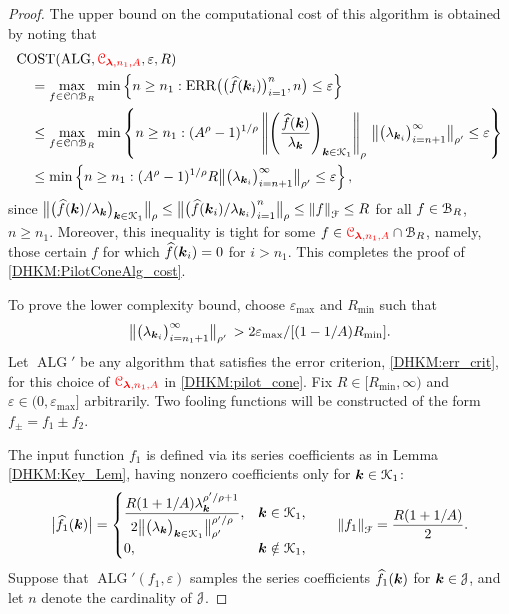 \documentclass[USenglish]{article}
\theoremstyle{dgthm}
\theoremstyle{dgthm}
\theoremstyle{dgthm}
\theoremstyle{dgthm}
\theoremstyle{dgdef}
\theoremstyle{definition}
\DeclareMathOperator{\ALG}{ALG}
\DeclareMathOperator{\ERR}{ERR}
\newcommand{\dataN}{\bigl(\hf(\bsk_i)\bigr)_{i=1}^n}
\newcommand{\ERRN}{\ERR\bigl(\dataN,n\bigr)}
\DeclareMathOperator{\COST}{COST}
\newcommand{\hf}{\widehat{f}}
\newcommand{\bigabs}[1]{\ensuremath{\bigl \lvert #1 \bigr \rvert}}
\newcommand{\norm}[2][{}]{\ensuremath{\left \lVert #2 \right \rVert}_{#1}}
\newcommand{\bignorm}[2][{}]{\ensuremath{\bigl \lVert #2 \bigr \rVert}_{#1}}
\newcommand{\DHKMchange}[1]{{\color{red}{#1}}}
\begin{document}
\begin{proof} 
The upper bound on the computational cost of this algorithm is obtained by noting that 
\begin{align*}
    \MoveEqLeft[1]{\COST(\ALG,\DHKMchange{\calC_{\boldsymbol{\lambda},n_1,A}},\varepsilon,R)} \\
    & = \max_{f \in \calC \cap \calB_{R}} \min \left \{n \ge n_1 : \ERRN \le \varepsilon \right \} \\
     & \le \max_{f \in \calC \cap \calB_{R}} \min \left \{n \ge n_1 : 
     (A^\rho -1)^{1/\rho} \norm[\rho]{\left( \frac{\hf(\bsk)}{\lambda_{\bsk}} \right)_{\bsk \in \calK_1 }} \, 
     \bignorm[\rho']{\bigl(  \lambda_{\bsk_i}  \bigr)_{i = n+1}^{\infty}}
    \le \varepsilon \right \} \\   
     & \le \min \left \{n \ge n_1 : 
     (A^\rho -1)^{1/\rho} R \bignorm[\rho']{\bigl(  \lambda_{\bsk_i}  \bigr)_{i = n+1}^{\infty}} 
    \le \varepsilon \right \},  
\end{align*}
since $\bignorm[\rho]{\bigl( \hf(\bsk)/\lambda_{\bsk} \bigr)_{\bsk \in \calK_1}} \le \bignorm[\rho]{\bigl( \hf(\bsk_i)/\lambda_{\bsk_i} \bigr)_{i=1}^{n}} \le  \norm[\calF]{f} \le R$ for all $f \in {\mathcal{B}}_R$, $n \ge n_1$.  Moreover, this inequality is tight for some $f \in \DHKMchange{\calC_{\boldsymbol{\lambda},n_1,A}} \cap \calB_{R}$, namely, those certain $f$ for which $\hf(\bsk_i) = 0$ for $i > n_1$.  This completes the proof of \eqref{DHKM:PilotConeAlg_cost}.

To prove the lower complexity bound, choose $\varepsilon_{\max}$ and $R_{\min}$ such that 
\[
\bignorm[\rho']{\bigl(  \lambda_{\bsk_i}  \bigr)_{i = n_1+1}^{\infty}} \,
    > 2\varepsilon_{\max}/[(1 - 1/A) R_{\min}].
    \]
Let $\ALG'$ be any algorithm that satisfies the error criterion, \eqref{DHKM:err_crit}, for this choice of $\DHKMchange{\calC_{\boldsymbol{\lambda},n_1,A}}$ in \eqref{DHKM:pilot_cone}.   Fix $R \in [R_{\min},\infty)$ and $\varepsilon \in (0,\varepsilon_{\max}]$ arbitrarily.  Two fooling functions will be constructed of the form $f_\pm = f_1 \pm f_2$.  

The input function $f_1$ is defined via its series coefficients as in Lemma \ref{DHKM:Key_Lem}, having nonzero coefficients only for ${\boldsymbol{k}} \in {\mathcal{K}}_1$:
\begin{equation*}
    \bigabs{\hf_1(\bsk)} = \begin{cases} \displaystyle \frac{R (1+1/A) \lambda_{\bsk}^{\rho'/\rho + 1}}{2\bignorm[\rho']{\bigl(  \lambda_{\bsk}  \bigr)_{\bsk \in \calK_1}}^{\rho'/\rho}}, &  \bsk \in \calK_1, \\
    0, & \bsk \notin \calK_1,
    \end{cases}
   \qquad \norm[\calF]{f_1} = \frac{R(1 + 1/A)}{2}.
\end{equation*}
Suppose that $\ALG'(f_1,\varepsilon)$ samples the series coefficients $\hf_1(\bsk)$ for ${\boldsymbol{k}} \in {\mathcal{J}}$, and let $n$ denote the cardinality of ${\mathcal{J}}$.  


\end{proof}
\end{document}
